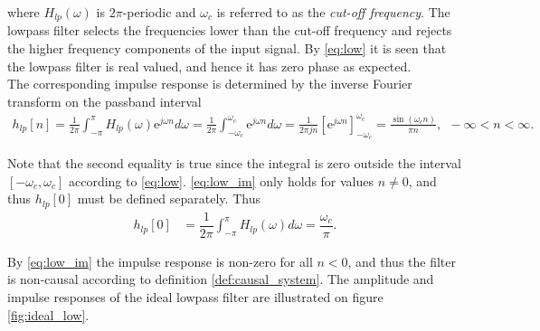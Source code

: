 where $H_{lp}(\omega)$ is $2\pi$-periodic and $\omega_c$ is referred to as the \textit{cut-off frequency}. The lowpass filter selects the frequencies lower than the cut-off frequency and rejects the higher frequency components of the input signal. By \eqref{eq:low} it is seen that the lowpass filter is real valued, and hence it has zero phase as expected. \\
The corresponding impulse response is determined by the inverse Fourier transform on the passband interval
\begin{align} \label{eq:low_im}
h_{lp}[n] = \frac{1}{2\pi} \int_{-\pi}^{\pi} H_{lp}(\omega) \text{e}^{j\omega n} d\omega =\frac{1}{2\pi}\int_{-\omega_c}^{\omega_c}\text{e}^{j\omega n} d\omega = \frac{1}{2\pi j n}\left[\text{e}^{j\omega n} \right]_{-\omega_c}^{\omega_c} = \frac{\sin(\omega_c n)}{\pi n}, \ \  -\infty < n < \infty.
\end{align}

Note that the second equality is true since the integral is zero outside the interval $[-\omega_c, \omega_c]$ according to \eqref{eq:low}. \eqref{eq:low_im} only holds for values $n \neq 0$, and thus $h_{lp}[0]$ must be defined separately. Thus 
\begin{align*}
h_{lp}[0] &= \dfrac{1}{2\pi} \int_{-\pi}^\pi H_{lp}(\omega) d\omega = \dfrac{\omega_c}{\pi}.
\end{align*}

By \eqref{eq:low_im} the impulse response is non-zero for all $n<0$, and thus the filter is non-causal according to definition \ref{def:causal_system}.
The amplitude and impulse responses of the ideal lowpass filter are illustrated on figure \ref{fig:ideal_low}.

